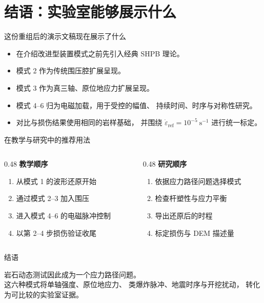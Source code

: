 \documentclass[11pt,aspectratio=169]{beamer}
\begin{document}
\section{结语：实验室能够展示什么}

\begin{frame}{这份重组后的演示文稿现在展示了什么}
  \begin{itemize}
    \item 在介绍改进型装置模式之前先引入经典 SHPB 理论。
    \item 模式 2 作为传统围压腔扩展呈现。
    \item 模式 3 作为真三轴、原位地应力扩展呈现。
    \item 模式 4--6 归为电磁加载，用于受控的幅值、
          持续时间、时序与对称性研究。
    \item 对比与损伤结果使用相同的岩样基础，
          并围绕 $\dot{\varepsilon}_{\mathrm{ref}}=10^{-5}\ \mathrm{s}^{-1}$
          进行统一标定。
  \end{itemize}
\end{frame}

\begin{frame}{在教学与研究中的推荐用法}
  \begin{columns}[T,onlytextwidth]
    \begin{column}{0.48\textwidth}
      \textbf{教学顺序}
      \begin{enumerate}
        \item 从模式 1 的波形还原开始
        \item 通过模式 2--3 加入围压
        \item 进入模式 4--6 的电磁脉冲控制
        \item 以第 2--4 步损伤验证收尾
      \end{enumerate}
    \end{column}
    \begin{column}{0.48\textwidth}
      \textbf{研究顺序}
      \begin{enumerate}
        \item 依据应力路径问题选择模式
        \item 检查杆塑性与应力平衡
        \item 导出还原后的时程
        \item 标定损伤与 DEM 描述量
      \end{enumerate}
    \end{column}
  \end{columns}
\end{frame}

\begin{frame}{结语}
  \begin{center}
    \Large 岩石动态测试因此成为一个应力路径问题。\\[6pt]
    \normalsize 这六种模式将单轴强度、原位地应力、
    类爆炸脉冲、地震时序与开挖扰动，
    转化为可比较的实验室证据。
  \end{center}
\end{frame}
\end{document}
